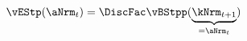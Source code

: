   \begin{equation}\begin{gathered}\begin{aligned}
\vEStp(\aNrm_{t}) & = \DiscFac \vBStpp(\underbrace{\kNrm_{t+1}}_{=\aNrm_{t}}) \label{eq:vEStp}
      \end{aligned}\end{gathered}\end{equation}
